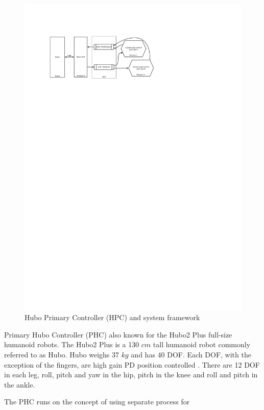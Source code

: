 \begin{figure}[thpb]
  \centering
\includegraphics[width=1.0\columnwidth]{./pix/hubo-ach-diagram.pdf}
  \caption{Hubo Primary Controller (HPC) and system framework}
  \label{fig:graph}
\end{figure}





 Primary Hubo Controller (PHC) also known for the Hubo2 Plus full-size humanoid robots.  
The Hubo2 Plus is a 130 $cm$ tall humanoid robot commonly referred to as Hubo.  
Hubo weighs 37 $kg$ and has 40 DOF.
Each DOF, with the exception of the fingers, are high gain PD position controlled .  
There are 12 DOF in each leg, roll, pitch and yaw in the hip, pitch in the knee and roll and pitch in the ankle.  

The PHC runs on the concept of using separate process for 



